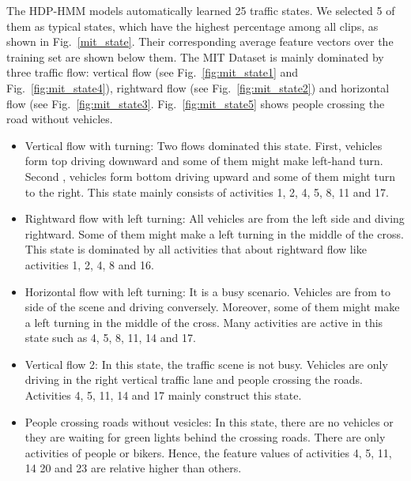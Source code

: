 The HDP-HMM models automatically learned 25 traffic states. We selected 5 of them as typical states, which have the highest percentage among all clips, as shown in Fig.~\ref{mit_state}. Their corresponding average feature vectors over the training set are shown below them. The MIT Dataset is mainly dominated by three traffic flow: vertical flow (see Fig.~\ref{fig:mit_state1} and Fig.~\ref{fig:mit_state4}), rightward flow (see Fig.~\ref{fig:mit_state2}) and horizontal flow (see Fig.~\ref{fig:mit_state3}. Fig.~\ref{fig:mit_state5} shows people crossing the road without vehicles.
\begin{itemize}
	\item Vertical flow with turning: Two flows dominated this state. First, vehicles form top driving downward and some of them might make left-hand turn. Second , vehicles form bottom driving upward and some of them might turn to the right. This state mainly consists of activities 1, 2, 4, 5, 8, 11 and 17.
	\item Rightward flow with left turning: All vehicles are from the left side and diving rightward. Some of them might make a left turning in the middle of the cross. This state is dominated by all activities that about rightward flow like activities 1, 2, 4, 8 and 16.
	\item Horizontal flow with left turning: It is a busy scenario. Vehicles are from to side of the scene and driving conversely. Moreover, some of them might make a left turning in the middle of the cross. Many activities are active in this state such as 4, 5, 8, 11, 14 and 17.
	\item Vertical flow 2: In this state, the traffic scene is not busy. Vehicles are only driving in the right vertical traffic lane and people crossing the roads. Activities 4, 5, 11, 14 and 17 mainly construct this state.
	\item People crossing roads without vesicles: In this state, there are no vehicles or they are waiting for green lights behind the crossing roads. There are only activities of people or bikers. Hence, the feature values of activities 4, 5, 11, 14 20 and 23 are relative higher than others.
\end{itemize}

